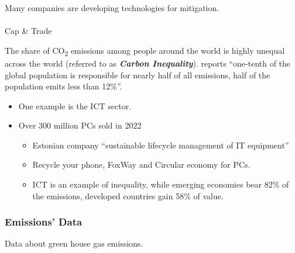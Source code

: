 \documentclass[
  letterpaper,
  DIV=11,
  numbers=noendperiod]{scrartcl}
\makeatletter
\let\oldparagraph\paragraph
\renewcommand{\paragraph}{
    \@ifstar
      \xxxParagraphStar
      \xxxParagraphNoStar
  }
\newcommand{\xxxParagraphStar}[1]{\oldparagraph*{#1}\mbox{}}
\newcommand{\xxxParagraphNoStar}[1]{\oldparagraph{#1}\mbox{}}
\providecommand{\tightlist}{%
  \setlength{\itemsep}{0pt}\setlength{\parskip}{0pt}}\usepackage{longtable,booktabs,array}
\makeatother
\begin{document}
Many companies are developing technologies for mitigation.

\paragraph{Cap \& Trade}\label{cap-trade}

The share of CO\textsubscript{2} emissions among people around the world
is highly unequal across the world (referred to as \textbf{\emph{Carbon
Inequality}}). \citep{chancelGlobalCarbonInequality2022} reports
``one-tenth of the global population is responsible for nearly half of
all emissions, half of the population emits less than 12\%''.

\begin{itemize}
\item
  One example is the ICT sector.
\item
  \citet{bajarinPCSalesAre} Over 300 million PCs sold in 2022

  \begin{itemize}
  \tightlist
  \item
    \citet{GreenDiceReinventingIdea2021} Estonian company ``sustainable
    lifecycle management of IT equipment''
  \item
    \citet{arilehtKestlikkuseSuunanaitajadSaadavad2022} Recycle your
    phone, FoxWay and Circular economy for PCs.
  \item
    \citet{zhouCarboneconomicInequalityGlobal2022} ICT is an example of
    inequality, while emerging economies bear 82\% of the emissions,
    developed countries gain 58\% of value.
  \end{itemize}
\end{itemize}

\subsubsection{Emissions' Data}\label{emissions-data}

Data about green house gas emissions.
\end{document}
